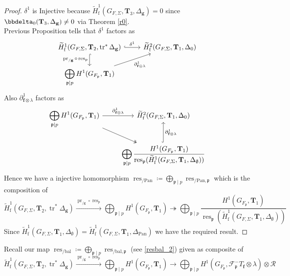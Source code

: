 \documentclass[10pt]{amsart}
\numberwithin{equation}{section}
\theoremstyle{definition}
\theoremstyle{remark} %
\newcommand{\pan}{\mathrm{Pan}}
\DeclareMathOperator{\res}{res}
\renewcommand{\b}{\mathrm{bal}}
\newcommand{\f}{\mathbf{f}}
\newcommand{\scrF}{\mathscr{F}}
\newcommand{\g}{\mathbf{g}}
\newcommand{\p}{\mathfrak{p}}
\newcommand{\R}{\mathcal{R}}
\newcommand{\T}{\mathbf{T}}
\begin{document}
		\begin{proof}
			$ \delta^1 $ is Injective because $ \widetilde{H}^1_{\mathrm{f}}(G_{F,\Sigma}, \T_3, \Delta_{\g}) =0 $ since $\bbdelta_0(\T_{3},\Delta_{\g}) \ne 0 $ via Theorem \ref{r0}. \\
			Previous Proposition tells that $ \delta^1 $ factors as 
			\begin{equation}
				\begin{tikzcd}
					\widetilde{H}^1_{\mathrm{f}}(G_{F,\Sigma}, \T_2, \operatorname{tr}^*\Delta_{\g}) \arrow[r, hook, "\delta^1"]
					\arrow[d, hook, "\operatorname{pr}_{/\g} \circ \res_{p} " '] & \widetilde{H}^2_{\mathrm{f}}(G_{F,\Sigma}, \T_1, \Delta_{0}) \\
					\smashoperator[r]{\bigoplus_{\p \mid p}}H^1(G_{F_{\p}}, \T_{1}) \arrow[ur, "\partial_{\f \otimes \lambda}^1 " '] & 
				\end{tikzcd}
			\end{equation}
			Also $ \partial_{\f \otimes \lambda}^1$ factors as 
			\begin{equation}
				\begin{tikzcd}
					\smashoperator[r]{\bigoplus_{\p \mid p}}H^1(G_{F_{\p}}, \T_{1}) \arrow[r, "\partial_{\f \otimes \lambda}^1 "] \arrow[dr, twoheadrightarrow] & \widetilde{H}^2_{\mathrm{f}}(G_{F,\Sigma}, \T_1, \Delta_{0}) \\
					& \smashoperator[r]{\bigoplus_{\p \mid p}} \frac{H^1(G_{F_{\p}}, \T_{1})}{\res_{\p}(\widetilde{H}^1_{\mathrm{f}}(G_{F,\Sigma},\T_{1}, \Delta_{\emptyset}))} \arrow[u, hook, " \partial_{\f \otimes \lambda}^1 " ']
				\end{tikzcd}
			\end{equation}
			Hence we have a injective homomorphism $ \res_{/\pan}\coloneqq \bigoplus_{\p \mid p}\res_{/\pan, \p} $ which is the composition of 
			$$ \widetilde{H}^1_{\mathrm{f}}(G_{F,\Sigma}, \T_2, \operatorname{tr}^*\Delta_{\g}) \xrightarrow{\operatorname{pr}_{/\g} \circ \res_p} \bigoplus_{\p \mid p}H^1(G_{F_{\p}}, \T_{1})\twoheadrightarrow \bigoplus_{\p \mid p} \frac{H^1(G_{F_{\p}}, \T_{1})}{\res_{\p}(\widetilde{H}^1_{\mathrm{f}}(G_{F,\Sigma},\T_{1}, \Delta_{\emptyset}))} $$
			Since $ \widetilde{H}^1_{\mathrm{f}}(G_{F,\Sigma},\T_{1}, \Delta_{\emptyset}) = \widetilde{H}^1_{\mathrm{f}}(G_{F,\Sigma},\T_{1}, \Delta_{\pan}) $ we have the  required result.
		\end{proof}
		Recall our map $ \res_{/\b}\coloneqq\bigoplus_{\p \mid p}\res_{/\b, \p} $ (see \ref{resbal_2}) given as composite of 
		$$ \widetilde{H}^1_{\mathrm{f}}(G_{F,\Sigma}, \T_2, \operatorname{tr}^*\Delta_{\g}) \xrightarrow{\operatorname{pr}_{/\g} \circ \res_p} \bigoplus_{\p \mid p}H^1(G_{F_{\p}}, \T_{1}) \rightarrow \bigoplus_{\p \mid p} H^1(G_{F_\p},\scrF^-_\p T_\f \otimes \lambda) \otimes \R $$
\end{document}
